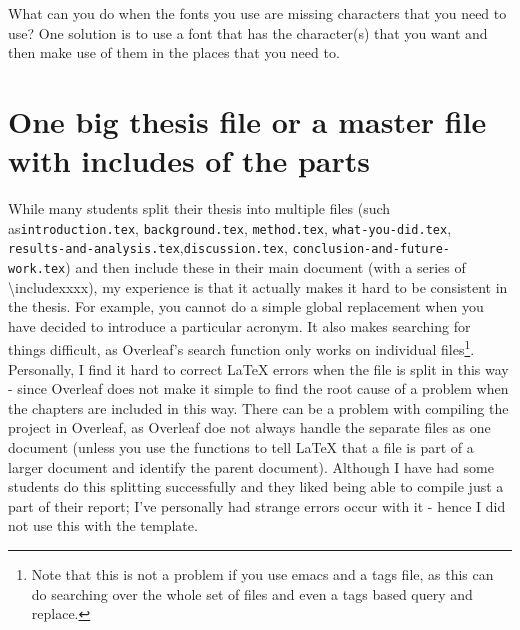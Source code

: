 \documentclass[examplethesis.tex]{subfiles}
\begin{document}
What can you do when the fonts you use are missing characters that you need to use? One solution is to use a font that has the character(s) that you want and then make use of them in the places that you need to.


\section{One big thesis file or a master file with includes of the parts}
\label{sec:onebigFIlevsincludes}

While many students split their thesis into multiple files (such as\linebreak[4] \texttt{introduction.tex}, \texttt{background.tex}, \texttt{method.tex}, \linebreak[4]\texttt{what-you-did.tex}, \texttt{results-and-analysis.tex},\linebreak[4] \texttt{discussion.tex}, \texttt{conclusion-and-future-work.tex}) and then include these in their main document (with a series of \textbackslash include{xxxx}), my experience is that it actually makes it hard to be consistent in the thesis. For example, you cannot do a simple global replacement when you have decided to introduce a particular acronym. It also makes searching for things difficult, as Overleaf's search function only works on individual files\footnote{Note that this is not a problem if you use emacs and a tags file, as this can do searching over the whole set of files and even a tags based query and replace.}. Personally, I find it hard to correct LaTeX errors when the file is split in this way - since Overleaf does not make it simple to find the root cause of a problem when the chapters are included in this way. There can be a problem with compiling the project in Overleaf, as Overleaf doe not always handle the separate files as one document (unless you use the functions to tell LaTeX that a file is part of a larger document and identify the parent document). Although I have had some students do this splitting successfully and they liked being able to compile just a part of their report; I've personally had strange errors occur with it - hence I did not use this with the template.
\end{document}

